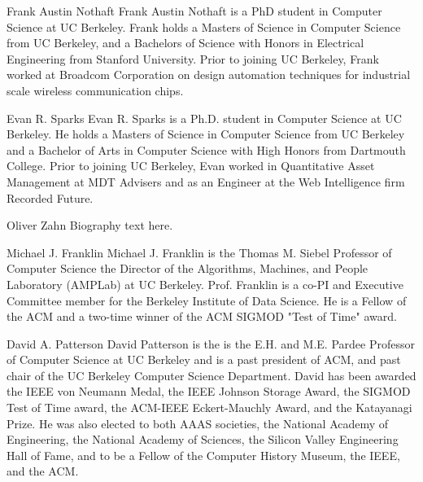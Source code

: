 \documentclass[10pt,journal,compsoc]{IEEEtran}
\begin{document}
\begin{IEEEbiography}{Frank Austin Nothaft}
Frank Austin Nothaft is a PhD student in Computer Science at UC Berkeley. Frank holds a Masters of Science in Computer Science from UC Berkeley, and a Bachelors of Science with Honors in Electrical Engineering from Stanford University. Prior to joining UC Berkeley, Frank worked at Broadcom Corporation on design automation techniques for industrial scale wireless communication chips.
\end{IEEEbiography}

\begin{IEEEbiography}{Evan R. Sparks}
Evan R. Sparks is a Ph.D. student in Computer Science at UC Berkeley. He holds a Masters of Science in Computer Science from UC Berkeley and a Bachelor of Arts in Computer Science with High Honors from Dartmouth College. Prior to joining UC Berkeley, Evan worked in Quantitative Asset Management at MDT Advisers and as an Engineer at the Web Intelligence firm Recorded Future.
\end{IEEEbiography}

\begin{IEEEbiography}{Oliver Zahn}
Biography text here.
\end{IEEEbiography}

\newpage

\begin{IEEEbiography}{Michael J. Franklin}
Michael J. Franklin is the Thomas M. Siebel Professor of Computer Science  the Director of the Algorithms, Machines, and People Laboratory (AMPLab) at UC Berkeley. Prof. Franklin is a co-PI and Executive Committee member for the Berkeley Institute of Data Science. He is a Fellow of the ACM and a two-time winner of the ACM SIGMOD "Test of Time" award.
\end{IEEEbiography}

\begin{IEEEbiography}{David A. Patterson}
David Patterson is the is the E.H. and M.E. Pardee Professor of Computer Science at UC Berkeley and is a past president of ACM, and past chair of the UC Berkeley Computer Science Department. David has been awarded the IEEE von Neumann Medal, the IEEE Johnson Storage Award, the SIGMOD Test of Time award, the ACM-IEEE Eckert-Mauchly Award, and the Katayanagi Prize. He was also elected to both AAAS societies, the National Academy of Engineering, the National Academy of Sciences, the Silicon Valley Engineering Hall of Fame, and to be a Fellow of the Computer History Museum, the IEEE, and the ACM.
\end{IEEEbiography}
\end{document}
